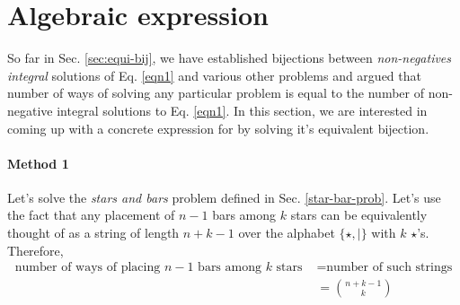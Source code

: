 \section{Algebraic expression}\label{alg-expr}
So far in Sec. \ref{sec:equi-bij}, we have established bijections between \emph{non-negatives integral} solutions of Eq. \ref{eqn1} and various other problems and argued that number of ways of solving any particular problem is equal to the number of non-negative integral solutions to Eq. \ref{eqn1}. In this section, we are interested in coming up with a concrete expression for  by solving it's equivalent bijection.

\paragraph{Method 1} Let's solve the \emph{stars and bars} problem defined in Sec. \ref{star-bar-prob}. Let's use the fact that any placement of $n-1$ bars among $k$ stars can be equivalently thought of as a string of length $n+k-1$ over the alphabet $\{\star,|\}$ with $k$ $\star$'s. Therefore, \begin{align*}
    \textrm{number of ways of placing } n-1 \textrm{ bars among } k \textrm{ stars } &= \textrm{number of such strings}\\
    &= \binom{n+k-1}{k}
\end{align*}

